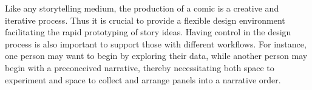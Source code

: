











Like any storytelling medium, the production of a comic is a creative and iterative process. Thus it is crucial to provide a flexible design environment facilitating the rapid prototyping of story ideas. Having control in the design process is also important to support those with different workflows.
For instance, one person may want to begin by exploring their data, while another person may begin with a preconceived narrative, thereby necessitating both space to experiment and space to collect and arrange panels into a narrative order.










